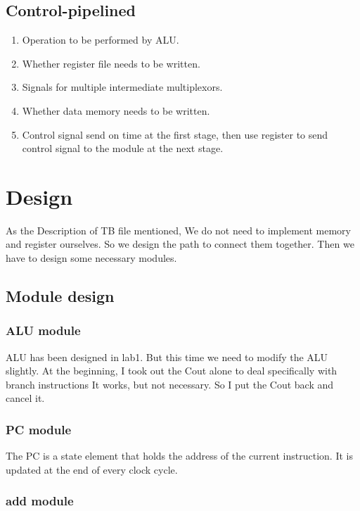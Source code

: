 \documentclass[12pt,a4paper]{article}
\begin{document}
\subsection{Control-pipelined}

\begin{enumerate}
\item Operation to be performed by ALU.
\item Whether register file needs to be written.
\item Signals for multiple intermediate multiplexors.
\item Whether data memory needs to be written. 
\item Control signal send on time at the first stage, then use register to send control signal to the module at the next stage. 
\end{enumerate}

\newpage

\section{Design}

As the Description of TB file mentioned, We do not need to implement memory and register ourselves.
So we design the path to connect them together.
Then we have to design some necessary modules.

\subsection{Module design}

\subsubsection{ALU module}

ALU has been designed in lab1.
But this time we need to modify the ALU slightly.
At the beginning, I took out the Cout alone to deal specifically with branch instructions
It works, but not necessary.
So I put the Cout back and cancel it.


\subsubsection{PC module}

The PC is a state element that holds the address of the current instruction. 
It is updated at the end of every clock cycle.

\subsubsection{add module}
\end{document}
